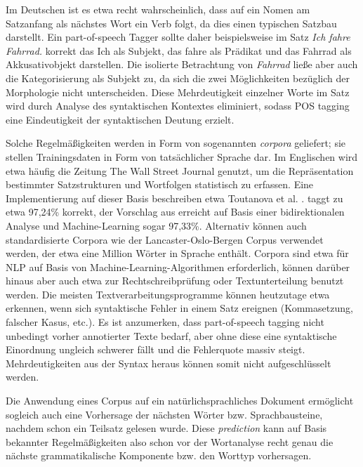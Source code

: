 \documentclass[12pt]{report}
\begin{document}
Im Deutschen ist es etwa recht wahrscheinlich, dass auf ein Nomen am Satzanfang als nächstes Wort ein Verb folgt, da dies einen typischen Satzbau darstellt. Ein part-of-speech Tagger sollte daher beispielsweise im Satz \textit{\glqq  Ich fahre Fahrrad.\grqq{}} korrekt das \glqq  Ich\grqq{} als Subjekt, das \glqq  fahre\grqq{} als Prädikat und das \glqq  Fahrrad\grqq{} als Akkusativobjekt darstellen. Die isolierte Betrachtung von \textit{\glqq  Fahrrad\grqq{}} ließe aber auch die Kategorisierung als Subjekt zu, da sich die zwei Möglichkeiten bezüglich der Morphologie nicht unterscheiden. Diese Mehrdeutigkeit einzelner Worte im Satz wird durch Analyse des syntaktischen Kontextes eliminiert, sodass POS tagging eine Eindeutigkeit der syntaktischen Deutung erzielt.

Solche Regelmäßigkeiten werden in Form von sogenannten \textit{corpora} geliefert; sie stellen Trainingsdaten in Form von tatsächlicher Sprache dar. Im Englischen wird etwa häufig die Zeitung The Wall Street Journal genutzt, um die Repräsentation bestimmter Satzstrukturen und Wortfolgen statistisch zu erfassen. Eine Implementierung auf dieser Basis beschreiben etwa Toutanova et al. \cite{tou03}. 
\cite{tou03} taggt zu etwa 97,24\% korrekt, der Vorschlag aus \cite{she07} erreicht auf Basis einer bidirektionalen Analyse und Machine-Learning sogar 97,33\%.
 Alternativ können auch standardisierte Corpora wie der Lancaster-Oslo-Bergen Corpus verwendet werden, der etwa eine Million Wörter in Sprache enthält. Corpora sind etwa für NLP auf Basis von Machine-Learning-Algorithmen erforderlich, können darüber hinaus aber auch etwa zur Rechtschreibprüfung oder Textunterteilung benutzt werden. Die meisten Textverarbeitungsprogramme können heutzutage etwa erkennen, wenn sich syntaktische Fehler in einem Satz ereignen (Kommasetzung, falscher Kasus, etc.). Es ist anzumerken, dass part-of-speech tagging nicht unbedingt vorher annotierter Texte bedarf, aber ohne diese eine syntaktische Einordnung ungleich schwerer fällt und die Fehlerquote massiv steigt. Mehrdeutigkeiten aus der Syntax heraus können somit nicht aufgeschlüsselt werden.

Die Anwendung eines Corpus auf ein natürlichsprachliches Dokument ermöglicht sogleich auch eine Vorhersage der nächsten Wörter bzw. Sprachbausteine, nachdem schon ein Teilsatz gelesen wurde. Diese \textit{prediction} kann auf Basis bekannter Regelmäßigkeiten also schon vor der Wortanalyse recht genau die nächste grammatikalische Komponente bzw. den Worttyp vorhersagen.
\end{document}
